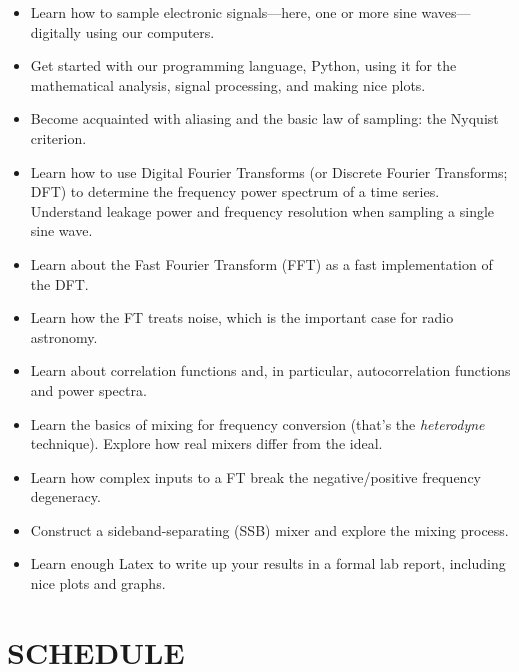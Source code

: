\documentclass[12pt,preprint]{aastex}
\begin{document}
\begin{itemize}

\item Learn how to sample electronic signals---here, one or more sine
  waves---digitally using our computers.

\item Get started with our programming language, Python, using it for the
  mathematical analysis, signal processing, and making nice plots.

\item Become acquainted with aliasing and the basic law of sampling: the
  Nyquist criterion.

\item Learn how to use Digital Fourier Transforms (or Discrete Fourier
  Transforms; DFT) to determine the frequency power spectrum of a time
  series. Understand leakage power and frequency resolution when
  sampling a single sine wave.

\item Learn about the Fast Fourier Transform (FFT) as a fast
  implementation of the DFT.

\item Learn how the FT treats noise, which is the important case for
  radio astronomy.

\item Learn about correlation functions and, in particular,
  autocorrelation functions and power spectra.

\item Learn the basics of mixing for frequency conversion (that's
  the {\it heterodyne} technique). Explore how real mixers differ from
  the ideal.

\item Learn how complex inputs to a FT break the negative/positive
  frequency degeneracy.

\item Construct a sideband-separating (SSB) mixer and explore the mixing
  process.
  

\item Learn enough Latex to write up your results in a formal lab
  report, including nice plots and graphs.

\end{itemize}

\section{SCHEDULE}
\end{document}
